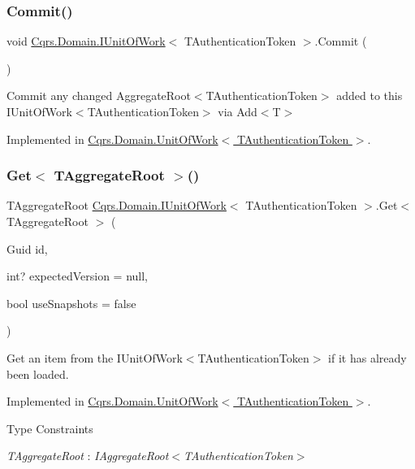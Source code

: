 \subsubsection{\texorpdfstring{Commit()}{Commit()}}
{\footnotesize\ttfamily void \hyperlink{interfaceCqrs_1_1Domain_1_1IUnitOfWork}{Cqrs.\+Domain.\+I\+Unit\+Of\+Work}$<$ T\+Authentication\+Token $>$.Commit (\begin{DoxyParamCaption}{ }\end{DoxyParamCaption})}



Commit any changed Aggregate\+Root$<$\+T\+Authentication\+Token$>$ added to this I\+Unit\+Of\+Work$<$\+T\+Authentication\+Token$>$ via Add$<$\+T$>$ 



Implemented in \hyperlink{classCqrs_1_1Domain_1_1UnitOfWork_a7401e41dd8ce4457551c252ca6402d31_a7401e41dd8ce4457551c252ca6402d31}{Cqrs.\+Domain.\+Unit\+Of\+Work$<$ T\+Authentication\+Token $>$}.

\mbox{\label{interfaceCqrs_1_1Domain_1_1IUnitOfWork_aee78f81d472577a65356bc1c05207180_aee78f81d472577a65356bc1c05207180}} 
\subsubsection{\texorpdfstring{Get$<$ T\+Aggregate\+Root $>$()}{Get< TAggregateRoot >()}}
{\footnotesize\ttfamily T\+Aggregate\+Root \hyperlink{interfaceCqrs_1_1Domain_1_1IUnitOfWork}{Cqrs.\+Domain.\+I\+Unit\+Of\+Work}$<$ T\+Authentication\+Token $>$.Get$<$ T\+Aggregate\+Root $>$ (\begin{DoxyParamCaption}\item[{Guid}]{id,  }\item[{int?}]{expected\+Version = {\ttfamily null},  }\item[{bool}]{use\+Snapshots = {\ttfamily false} }\end{DoxyParamCaption})}



Get an item from the I\+Unit\+Of\+Work$<$\+T\+Authentication\+Token$>$ if it has already been loaded. 



Implemented in \hyperlink{classCqrs_1_1Domain_1_1UnitOfWork_a0592865d52ba0eafb9a5ad1fbdad9729_a0592865d52ba0eafb9a5ad1fbdad9729}{Cqrs.\+Domain.\+Unit\+Of\+Work$<$ T\+Authentication\+Token $>$}.

\begin{Desc}
\item[Type Constraints]\begin{description}
\item[{\em T\+Aggregate\+Root} : {\em I\+Aggregate\+Root$<$T\+Authentication\+Token$>$}]\end{description}
\end{Desc}
